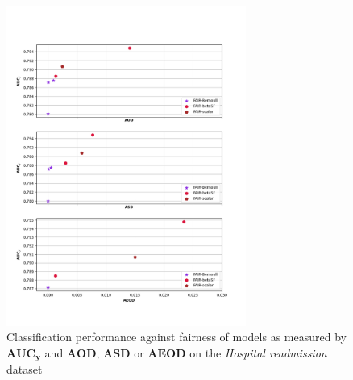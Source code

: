 \documentclass[preprint,12pt]{elsarticle}
\begin{document}
\begin{figure}
	\center
	\includegraphics[angle=0, width=0.7\textwidth]{Readmission.png}
	\captionsetup{justification=centering}
	\caption{Classification performance against fairness of models as measured by $\mathbf{AUC_y}$ and $\mathbf{AOD}$, $\mathbf{ASD}$ or $\mathbf{AEOD}$ on the \textit{Hospital readmission} dataset}
	\label{fig:Readmission}
	\vskip -0.2in
\end{figure}
\end{document}
